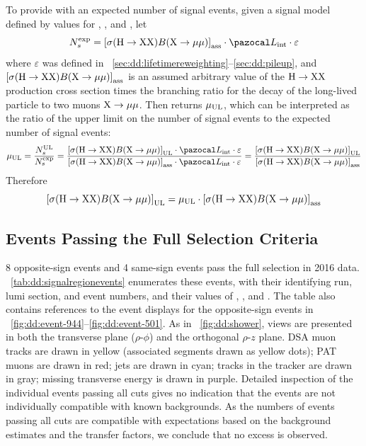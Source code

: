 To provide \combine with an expected number of \twoMu signal events, given a signal model defined by values for \mH, \mX, and \cTau, let
\begin{equation}
  N_s^\text{exp} = \left[\sigma(\PHiggs\to \PLLP\PLLP)B(\PLLP\to\Pgm\Pgm)\right]_\text{ass} \cdot \intlumi \cdot \varepsilon
  \label{eq:dd:nExp}
\end{equation}
where $\varepsilon$ was defined in \Secs~\ref{sec:dd:lifetimereweighting}--\ref{sec:dd:pileup}, and $\left[\sigma(\mathrm{H}\to \mathrm{X}\mathrm{X})B(\mathrm{X}\to\mathrm{\mu}\mathrm{\mu})\right]_\text{ass}$ is an assumed arbitrary value of the $\mathrm{H}\to \mathrm{X}\mathrm{X}$ production cross section times the branching ratio for the decay of the long-lived particle to two muons $\mathrm{X}\to\mathrm{\mu}\mathrm{\mu}$.
Then \combine returns $\mu_\text{UL}$, which can be interpreted as the ratio of the upper limit on the number of \twoMu signal events to the expected number of \twoMu signal events:
\begin{equation}
  \sigstr_\text{UL} = \frac{N_s^\text{UL}}{N_s^\text{exp}} = \frac{\left[\sigma(\PHiggs\to \PLLP\PLLP)B(\PLLP\to\Pgm\Pgm)\right]_\text{UL} \cdot \intlumi \cdot \varepsilon}{\left[\sigma(\PHiggs\to \PLLP\PLLP)B(\PLLP\to\Pgm\Pgm)\right]_\text{ass} \cdot \intlumi \cdot \varepsilon} = \frac{\left[\sigma(\PHiggs\to \PLLP\PLLP)B(\PLLP\to\Pgm\Pgm)\right]_\text{UL}}{\left[\sigma(\PHiggs\to \PLLP\PLLP)B(\PLLP\to\Pgm\Pgm)\right]_\text{ass}}
  \label{eq:dd:sigmaBfromSigStr}
\end{equation}
Therefore
\begin{equation}
  \left[\sigma(\mathrm{H}\to \mathrm{X}\mathrm{X})B(\mathrm{X}\to\mathrm{\mu}\mathrm{\mu})\right]_\text{UL} = \mu_\text{UL} \cdot \left[\sigma(\mathrm{H}\to \mathrm{X}\mathrm{X})B(\mathrm{X}\to\mathrm{\mu}\mathrm{\mu})\right]_\text{ass}
  \label{eq:dd:sigmaB}
\end{equation}

\subsection{Events Passing the Full Selection Criteria}
\label{sec:dd:eventdisplays}
8 opposite-sign events and 4 same-sign events pass the full selection in 2016 data.
\Tab~\ref{tab:dd:signalregionevents} enumerates these events, with their identifying run, lumi section, and event numbers, and their values of \mMuMu, \DeltaPhi, and \LxySig.
The table also contains references to the event displays for the opposite-sign events in \Figs~\ref{fig:dd:event-944}--\ref{fig:dd:event-501}.
As in \Fig~\ref{fig:dd:shower}, views are presented in both the transverse plane ($\rho$-$\phi$) and the orthogonal $\rho$-$z$ plane.
DSA muon tracks are drawn in yellow (associated segments drawn as yellow dots); PAT muons are drawn in red; jets are drawn in cyan; tracks in the tracker are drawn in gray; missing transverse energy is drawn in purple.
Detailed inspection of the individual events passing all cuts gives no indication that the events are not individually compatible with known backgrounds.
As the numbers of events passing all cuts are compatible with expectations based on the background estimates and the transfer factors, we conclude that no excess is observed.



